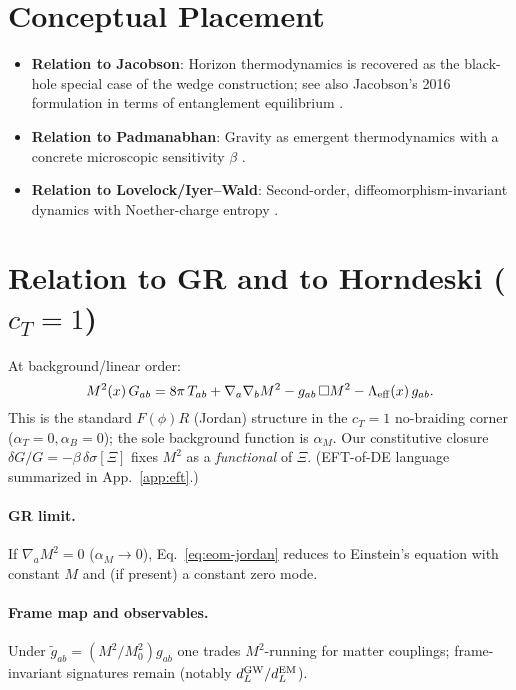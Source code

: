 \documentclass[aps,prd,onecolumn,superscriptaddress,nofootinbib]{revtex4-2}
\begin{document}
\section{Conceptual Placement}
\begin{itemize}[leftmargin=1.3em]
\item \textbf{Relation to Jacobson}: Horizon thermodynamics is recovered as the black-hole special case of the wedge construction; see also Jacobson's 2016 formulation in terms of entanglement equilibrium \cite{Jacobson2016}.
\item \textbf{Relation to Padmanabhan}: Gravity as emergent thermodynamics with a concrete microscopic sensitivity \(\beta\) \cite{Padmanabhan2010}.
\item \textbf{Relation to Lovelock/Iyer--Wald}: Second-order, diffeomorphism-invariant dynamics \cite{Lovelock1971} with Noether-charge entropy \cite{IyerWald1994}.
\end{itemize}

\section{Relation to GR and to Horndeski (\texorpdfstring{$c_T=1$}{cT=1})}
\label{sec:GR-Horndeski}
At background/linear order:
\begin{equation}
M^2(x)\, G_{ab}
= 8\pi\, T_{ab}
+ \nabla_a\nabla_b M^2
- g_{ab}\,\Box M^2
- \Lambda_{\rm eff}(x)\, g_{ab}.
\label{eq:eom-jordan}
\end{equation}
This is the standard \(F(\phi)R\) (Jordan) structure in the \(c_T=1\) no-braiding corner (\(\alpha_T=0,\alpha_B=0\)); the sole background function is \(\alpha_M\). Our constitutive closure \(\delta G/G = -\beta\,\delta\sigma[\Xi]\) fixes \(M^2\) as a \emph{functional} of \(\Xi\). (EFT-of-DE language summarized in App.~\ref{app:eft}.)

\paragraph{GR limit.}
If \(\nabla_a M^2=0\) (\(\alpha_M\to0\)), Eq.~\eqref{eq:eom-jordan} reduces to Einstein’s equation with constant \(M\) and (if present) a constant zero mode.

\paragraph{Frame map and observables.}
Under \(\tilde g_{ab}=(M^2/M_0^2)g_{ab}\) one trades \(M^2\)-running for matter couplings; frame-invariant signatures remain (notably \(d_L^{\rm GW}/d_L^{\rm EM}\)).
\end{document}
